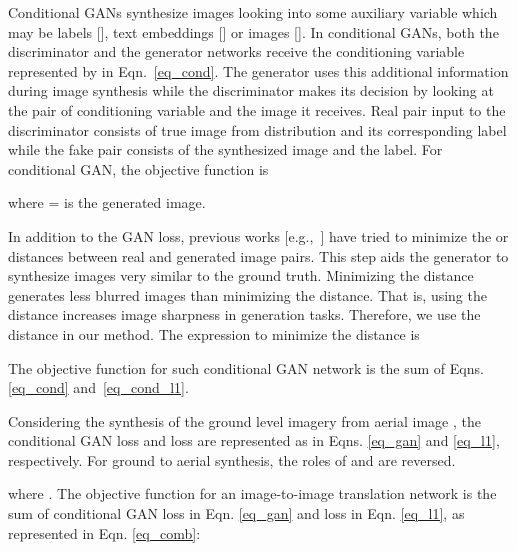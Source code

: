 \documentclass[times,twocolumn,final,authoryear]{elsarticle_modified}
\begin{document}
Conditional GANs synthesize images looking into some auxiliary variable which may be labels [\cite{DBLP:journals/corr/MirzaO14}], text embeddings [\cite{han2017stackgan,pmlr-v48-reed16}] or images [\cite{pix2pix2017,CycleGAN2017, pmlr-v70-kim17a}]. In conditional GANs, both the discriminator and the generator networks receive the conditioning variable represented by  in Eqn.~\eqref{eq_cond}. The generator uses this additional information during image synthesis while the discriminator makes its decision by looking at the pair of conditioning variable and the image it receives. Real pair input to the discriminator consists of true image from distribution and its corresponding label while the fake pair consists of the synthesized image and the label. For conditional GAN, the objective function is 

\vspace{-15pt}


where  =  is the generated image.

In addition to the GAN loss, previous works [e.g.,~\cite{pix2pix2017,CycleGAN2017,pathak2016context}] have tried to minimize the  or  distances between real and generated image pairs. This step aids the generator to synthesize images very similar to the ground truth. Minimizing the  distance generates less blurred images than minimizing the  distance. That is, using the  distance increases image sharpness in generation tasks. Therefore, we use the  distance in our method. The expression to minimize the  distance is
\vspace{-15pt}



The objective function for such conditional GAN network is the sum of Eqns. \eqref{eq_cond} and~\eqref{eq_cond_l1}.

Considering the synthesis of the ground level imagery  from aerial image , the conditional GAN loss and  loss are represented as in Eqns. \eqref{eq_gan} and \eqref{eq_l1}, respectively. For ground to aerial synthesis, the roles of  and  are reversed.
\vspace{-15pt}

 

\vspace{-10pt}



where .
The objective function for an image-to-image translation network is the sum of conditional GAN loss in Eqn. \eqref{eq_gan} and  loss in Eqn. \eqref{eq_l1}, as represented in Eqn. \eqref{eq_comb}: 
\end{document}
